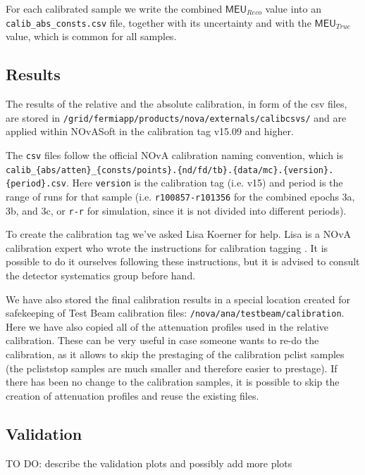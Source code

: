\documentclass[12pt,a4paper]{article}
\begin{document}
For each calibrated sample we write the combined $\textsf{MEU}_{Reco}$ value into an \texttt{calib\_abs\_consts.csv} file, together with its uncertainty and with the $\textsf{MEU}_{True}$ value, which is common for all samples.

\subsection{Results}
The results of the relative and the absolute calibration, in form of the csv files, are stored in \texttt{/grid/fermiapp/products/nova/externals/calibcsvs/} and are applied within NOvASoft in the calibration tag v15.09 and higher.

The \texttt{csv} files follow the official NOvA calibration naming convention, which is \\\texttt{calib\_\{abs/atten\}\_\{consts/points\}.\{nd/fd/tb\}.\{data/mc\}.\{version\}.\{period\}.csv}. Here \texttt{version} is the calibration tag (i.e. v15) and period is the range of runs for that sample (i.e. \texttt{r100857-r101356} for the combined epochs 3a, 3b, and 3c, or \texttt{r-r} for simulation, since it is not divided into different periods).

To create the calibration tag we've asked Lisa Koerner for help. Lisa is a NOvA calibration expert who wrote the instructions for calibration tagging \cite{NOVA-doc-59268}. It is possible to do it ourselves following these instructions, but it is advised to consult the detector systematics group before hand.

We have also stored the final calibration results in a special location created for safekeeping of Test Beam calibration files: \texttt{/nova/ana/testbeam/calibration}. Here we have also copied all of the attenuation profiles used in the relative calibration. These can be very useful in case someone wants to re-do the calibration, as it allows to skip the prestaging of the calibration pclist samples (the pcliststop samples are much smaller and therefore easier to prestage). If there has been no change to the calibration samples, it is possible to skip the creation of attenuation profiles and reuse the existing files.

\subsection{Validation}
TO DO: describe the validation plots and possibly add more plots
\end{document}
